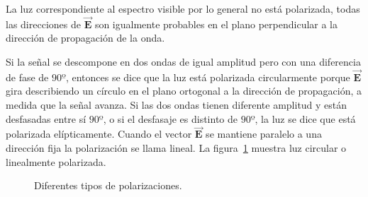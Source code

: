 La luz correspondiente al espectro visible por lo general no está polarizada, todas las direcciones de $\vec{\mathbf{E}}$ son igualmente probables en el plano perpendicular a la dirección de propagación de la onda. 

Si la señal se descompone en dos ondas de igual amplitud pero con una diferencia de fase de $90º$, entonces se dice que la luz está polarizada circularmente porque $\vec{\mathbf{E}}$ gira describiendo un círculo en el plano ortogonal a la dirección de propagación, a medida que la señal avanza. Si las dos ondas tienen diferente amplitud y están desfasadas entre sí $90º$, o si el desfasaje es distinto de $90º$, la luz se dice que está polarizada elípticamente. Cuando el vector $\vec{\mathbf{E}}$ se mantiene paralelo a una dirección fija la polarización se llama lineal. La figura~\ref{PolarizacionCircularLineal} muestra luz  circular o linealmente polarizada.

\begin{figure}[hbt]
	\centering    
	 \qquad
	\caption{\label{PolarizacionCircularLineal}Diferentes tipos de polarizaciones.}
\end{figure} 

